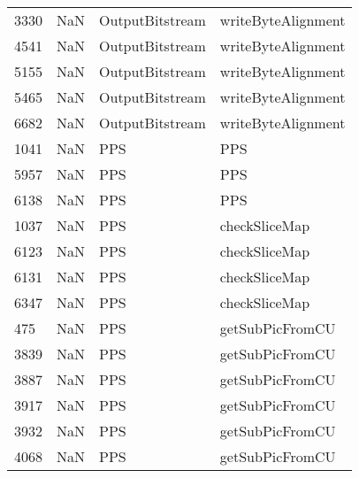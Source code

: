 \begin{tabular}{llll}
3330 &                   NaN &            OutputBitstream &                        writeByteAlignment \\
4541 &                   NaN &            OutputBitstream &                        writeByteAlignment \\
5155 &                   NaN &            OutputBitstream &                        writeByteAlignment \\
5465 &                   NaN &            OutputBitstream &                        writeByteAlignment \\
6682 &                   NaN &            OutputBitstream &                        writeByteAlignment \\
1041 &                   NaN &                        PPS &                                       PPS \\
5957 &                   NaN &                        PPS &                                       PPS \\
6138 &                   NaN &                        PPS &                                       PPS \\
1037 &                   NaN &                        PPS &                             checkSliceMap \\
6123 &                   NaN &                        PPS &                             checkSliceMap \\
6131 &                   NaN &                        PPS &                             checkSliceMap \\
6347 &                   NaN &                        PPS &                             checkSliceMap \\
475  &                   NaN &                        PPS &                           getSubPicFromCU \\
3839 &                   NaN &                        PPS &                           getSubPicFromCU \\
3887 &                   NaN &                        PPS &                           getSubPicFromCU \\
3917 &                   NaN &                        PPS &                           getSubPicFromCU \\
3932 &                   NaN &                        PPS &                           getSubPicFromCU \\
4068 &                   NaN &                        PPS &                           getSubPicFromCU \\

\end{tabular}
